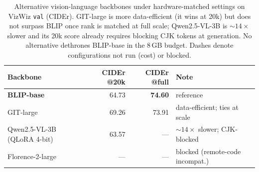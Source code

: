 \begin{table}[t]
  \centering
  \caption{Alternative vision-language backbones under hardware-matched
    settings on VizWiz \texttt{val} (CIDEr). GIT-large is more data-efficient
    (it wins at 20k) but does not surpass BLIP once rank is matched at full
    scale; Qwen2.5-VL-3B is $\sim\!14\times$ slower and its 20k score already
    requires blocking CJK tokens at generation. No alternative dethrones
    BLIP-base in the 8\,GB budget. Dashes denote configurations not run (cost)
    or blocked.}
  \label{tab:alt-vlm}
  \begin{tabular}{lrrl}
    \toprule
    Backbone & CIDEr @20k & CIDEr @full & Note \\
    \midrule
    \textbf{BLIP-base} & 64.73 & \textbf{74.60} & reference \\
    GIT-large          & 69.26 & 73.91 & data-efficient; ties at scale \\
    Qwen2.5-VL-3B (QLoRA 4-bit) & 63.57 & --- & $\sim\!14\times$ slower; CJK-blocked \\
    Florence-2-large   & ---   & ---   & blocked (remote-code incompat.) \\
    \bottomrule
  \end{tabular}
\end{table}
